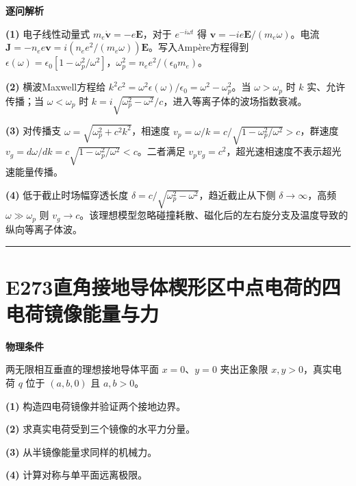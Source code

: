 \documentclass[UTF8,a4paper,11pt,oneside,openany]{ctexbook}
\begin{document}
\par\medskip\noindent\textbf{逐问解析}
\par\noindent\textbf{(1)} 电子线性动量式 \(m_e\dot{\boldsymbol v}=-e\boldsymbol E\)，对于 \(e^{-i\omega t}\) 得 \(\boldsymbol v=-i e\boldsymbol E/(m_e\omega)\)。电流 \(\boldsymbol J=-n_ee\boldsymbol v=i(n_ee^2/(m_e\omega))\boldsymbol E\)。写入Ampère方程得到 \(\epsilon(\omega)=\epsilon_0[1-\omega_p^2/\omega^2]\)，\(\omega_p^2=n_ee^2/(\epsilon_0m_e)\)。
\par\noindent\textbf{(2)} 横波Maxwell方程给 \(k^2c^2=\omega^2\epsilon(\omega)/\epsilon_0=\omega^2-\omega_p^2\)。当 \(\omega>\omega_p\) 时 \(k\) 实、允许传播；当 \(\omega<\omega_p\) 时 \(k=i\sqrt{\omega_p^2-\omega^2}/c\)，进入等离子体的波场指数衰减。
\par\noindent\textbf{(3)} 对传播支 \(\omega=\sqrt{\omega_p^2+c^2k^2}\)，相速度 \(v_p=\omega/k=c/\sqrt{1-\omega_p^2/\omega^2}>c\)，群速度 \(v_g=d\omega/dk=c\sqrt{1-\omega_p^2/\omega^2}<c\)。二者满足 \(v_pv_g=c^2\)，超光速相速度不表示超光速能量传播。
\par\noindent\textbf{(4)} 低于截止时场幅穿透长度 \(\delta=c/\sqrt{\omega_p^2-\omega^2}\)，趋近截止从下侧 \(\delta\to\infty\)，高频 \(\omega\gg\omega_p\) 则 \(v_g\to c\)。该理想模型忽略碰撞耗散、磁化后的左右旋分支及温度导致的纵向等离子体波。

\par\bigskip\hrule\bigskip
\section*{E273\quad 直角接地导体楔形区中点电荷的四电荷镜像能量与力}
\textbf{物理条件}\par 两无限相互垂直的理想接地导体平面 \(x=0\)、\(y=0\) 夹出正象限 \(x,y>0\)，真实电荷 \(q\) 位于 \((a,b,0)\) 且 \(a,b>0\)。
\par\noindent\textbf{(1)} 构造四电荷镜像并验证两个接地边界。
\par\noindent\textbf{(2)} 求真实电荷受到三个镜像的水平力分量。
\par\noindent\textbf{(3)} 从半镜像能量求同样的机械力。
\par\noindent\textbf{(4)} 计算对称与单平面远离极限。
\end{document}
